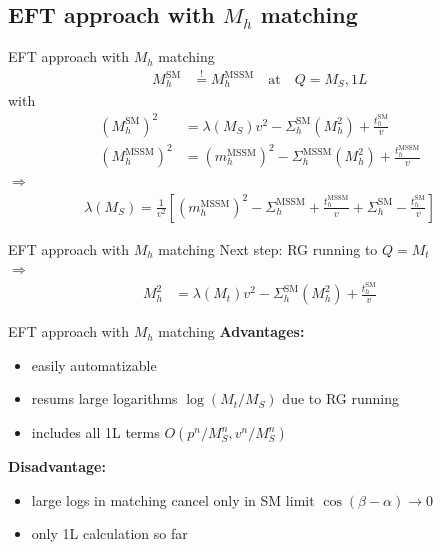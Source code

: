 \documentclass[hyperref={pdfpagelabels=false},ngerman]{beamer}
\renewcommand{\emph}{\textbf}
\newcommand{\SM}{\ensuremath{\text{SM}}}
\newcommand{\MSSM}{\ensuremath{\text{MSSM}}}
\begin{document}

\subsection{EFT approach with $M_h$ matching}

\begin{frame}{EFT approach with $M_h$ matching}
  \begin{align*}
    M_h^{\SM} &\overset{!}{=} M_h^\text{MSSM} \quad \text{at} \quad Q = M_S, 1L
  \end{align*}
  with
  \begin{align*}
    (M_h^{\SM})^2 &= \lambda(M_S) v^2 - \Sigma^{\SM}_h(M_h^2) + \frac{t_h^\SM}{v} \\
    (M_h^\text{MSSM})^2 &= (m_h^\text{MSSM})^2 - \Sigma^{\MSSM}_h(M_h^2) + \frac{t_h^\text{MSSM}}{v}
  \end{align*}
  $\Rightarrow$
  \begin{align*}
    \lambda(M_S) = \frac{1}{v^2} \left[
      (m_h^\text{MSSM})^2 - \Sigma^{\MSSM}_h + \frac{t_h^\text{MSSM}}{v}
      + \Sigma^{\SM}_h - \frac{t_h^\SM}{v}
    \right]
  \end{align*}
\end{frame}

\begin{frame}{EFT approach with $M_h$ matching}
  Next step: RG running to $Q = M_t$\\
  $\Rightarrow$
  \begin{align*}
    M_h^2 &= \lambda(M_t) v^2 - \Sigma^{\SM}_h(M_h^2) + \frac{t_h^\SM}{v}
  \end{align*}
\end{frame}


\begin{frame}{EFT approach with $M_h$ matching}
  \emph{Advantages:}
  \begin{itemize}
  \item easily automatizable
  \item resums large logarithms $\log(M_t/M_S)$ due to RG running
  \item includes all 1L terms $O(p^n/M_S^n, v^n/M_S^n)$
  \end{itemize}
  \emph{Disadvantage:}
  \begin{itemize}
  \item large logs in matching cancel only in SM limit $\cos(\beta - \alpha) \rightarrow 0$
  \item only 1L calculation so far
  \end{itemize}
\end{frame}
\end{document}
